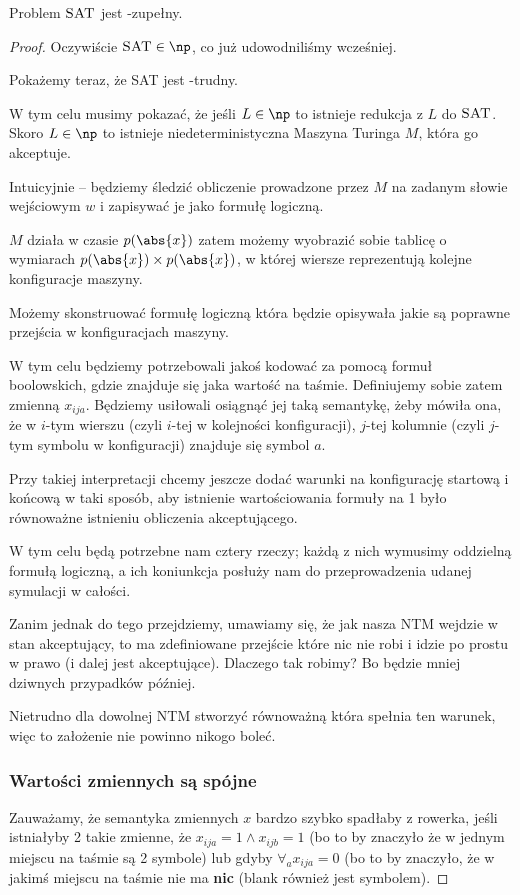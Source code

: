 \begin{theorem}
	Problem \( \textsc{SAT} \) jest \np-zupełny.
\end{theorem}
\begin{proof}
	Oczywiście \( \textsc{SAT} \in \np \), co już udowodniliśmy wcześniej.

	Pokażemy teraz, że \textsc{SAT} jest \np-trudny.

	W tym celu musimy pokazać, że jeśli \( L \in \np \) to istnieje redukcja z \( L \) do \( \textsc{SAT} \).
	Skoro \( L \in \np \) to istnieje niedeterministyczna Maszyna Turinga \( M \), która go akceptuje.

	Intuicyjnie -- będziemy śledzić obliczenie prowadzone przez \( M \) na zadanym słowie wejściowym \( w \) i zapisywać je jako formułę logiczną.

	\( M \) działa w czasie \( p(\abs{x}) \) zatem możemy wyobrazić sobie tablicę o wymiarach \( p(\abs{x}) \times p(\abs{x}) \), w której wiersze reprezentują kolejne konfiguracje maszyny.

	Możemy skonstruować formułę logiczną która będzie opisywała jakie są poprawne przejścia w konfiguracjach maszyny.

	W tym celu będziemy potrzebowali jakoś kodować za pomocą formuł boolowskich, gdzie znajduje się jaka wartość na taśmie. Definiujemy sobie zatem zmienną \( x_{ija} \). Będziemy usiłowali osiągnąć jej taką semantykę, żeby mówiła ona, że w \(i\)-tym wierszu (czyli \(i\)-tej w kolejności konfiguracji), \(j\)-tej kolumnie (czyli \(j\)-tym symbolu w konfiguracji) znajduje się symbol \(a\).

	Przy takiej interpretacji chcemy jeszcze dodać warunki na konfigurację startową i końcową w taki sposób, aby istnienie wartościowania formuły na 1 było równoważne istnieniu obliczenia akceptującego.

	W tym celu będą potrzebne nam cztery rzeczy; każdą z nich wymusimy oddzielną formułą logiczną, a ich koniunkcja posłuży nam do przeprowadzenia udanej symulacji w całości.

	Zanim jednak do tego przejdziemy, umawiamy się, że jak nasza NTM wejdzie w stan akceptujący, to ma zdefiniowane przejście które nic nie robi i idzie po prostu w prawo (i dalej jest akceptujące). Dlaczego tak robimy? Bo będzie mniej dziwnych przypadków później.

	Nietrudno dla dowolnej NTM stworzyć równoważną która spełnia ten warunek, więc to założenie nie powinno nikogo boleć.

	\subsubsection{Wartości zmiennych są spójne}
	Zauważamy, że semantyka zmiennych \(x\) bardzo szybko spadłaby z rowerka, jeśli istniałyby 2 takie zmienne, że \(x_{ija} = 1 \land x_{ijb} = 1\) (bo to by znaczyło że w jednym miejscu na taśmie są 2 symbole) lub gdyby \( \forall_a x_{ija} = 0\) (bo to by znaczyło, że w jakimś miejscu na taśmie nie ma \textbf{nic} (blank również jest symbolem).


\end{proof}
